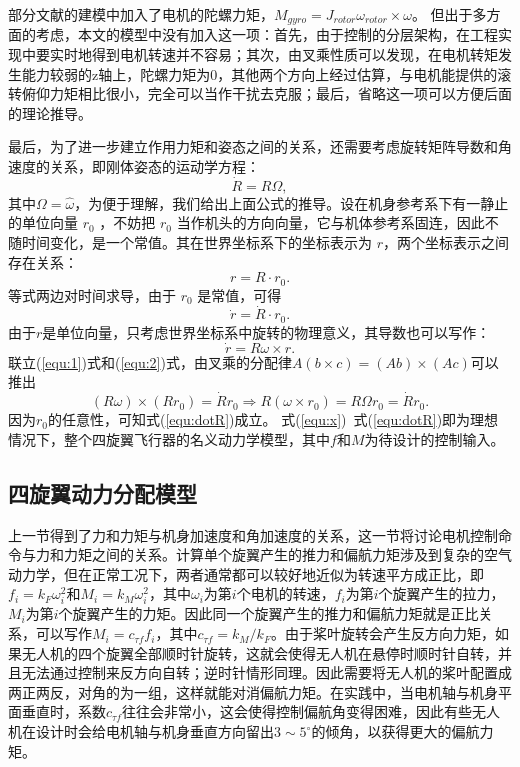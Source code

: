 部分文献的建模中加入了电机的陀螺力矩\cite{quanbook}，$M_{gyro}=J_{rotor} \omega_{rotor} \times \omega$。 但出于多方面的考虑，本文的模型中没有加入这一项：首先，由于控制的分层架构，在工程实现中要实时地得到电机转速并不容易；其次，由叉乘性质可以发现，在电机转矩发生能力较弱的z轴上，陀螺力矩为$0$，其他两个方向上经过估算，与电机能提供的滚转俯仰力矩相比很小，完全可以当作干扰去克服；最后，省略这一项可以方便后面的理论推导。

最后，为了进一步建立作用力矩和姿态之间的关系，还需要考虑旋转矩阵导数和角速度的关系，即刚体姿态的运动学方程：
  \begin{equation}
    \dot R=R\Omega,
    \label{equ:dotR}
  \end{equation}
其中$\Omega=\widehat \omega$，为便于理解，我们给出上面公式的推导。设在机身参考系下有一静止的单位向量 $r_0$ ，不妨把 $r_0$ 当作机头的方向向量，它与机体参考系固连，因此不随时间变化，是一个常值。其在世界坐标系下的坐标表示为 $r$，两个坐标表示之间存在关系：
  $$r=R \cdot r_0.$$
等式两边对时间求导，由于 $r_0$ 是常值，可得
  \begin{equation}
    \dot r= \dot R \cdot r_0.
    \label{equ:1}
  \end{equation}
由于$r$是单位向量，只考虑世界坐标系中旋转的物理意义，其导数也可以写作：
  \begin{equation}
    \dot r=R \omega \times r.
    \label{equ:2}
  \end{equation}
联立(\ref{equ:1})式和(\ref{equ:2})式，由叉乘的分配律$A(b\times c)=(Ab)\times (Ac)$可以推出
$$(R\omega)\times(Rr_0)=\dot R r_0\Rightarrow R(\omega \times r_0)=R\Omega r_0=\dot R r_0.$$
因为$r_0$的任意性，可知式(\ref{equ:dotR})成立。
式(\ref{equ:x})~式(\ref{equ:dotR})即为理想情况下，整个四旋翼飞行器的名义动力学模型，其中$f$和$M$为待设计的控制输入。
\subsection*{四旋翼动力分配模型}
上一节得到了力和力矩与机身加速度和角加速度的关系，这一节将讨论电机控制命令与力和力矩之间的关系。计算单个旋翼产生的推力和偏航力矩涉及到复杂的空气动力学，但在正常工况下，两者通常都可以较好地近似为转速平方成正比\cite{minimumsnap}，即$f_i=k_F \omega_i^2$和$M_i=k_M \omega_i^2$，其中$\omega_i$为第$i$个电机的转速，$f_i$为第$i$个旋翼产生的拉力，$M_i$为第$i$个旋翼产生的力矩。因此同一个旋翼产生的推力和偏航力矩就是正比关系，可以写作$M_i=c_{\tau f}f_i$，其中$c_{\tau f}=k_M/k_F$。由于桨叶旋转会产生反方向力矩，如果无人机的四个旋翼全部顺时针旋转，这就会使得无人机在悬停时顺时针自转，并且无法通过控制来反方向自转；逆时针情形同理。因此需要将无人机的桨叶配置成两正两反，对角的为一组，这样就能对消偏航力矩。在实践中，当电机轴与机身平面垂直时，系数$c_{\tau f}$往往会非常小，这会使得控制偏航角变得困难，因此有些无人机在设计时会给电机轴与机身垂直方向留出$3\sim5^\circ$的倾角，以获得更大的偏航力矩。

